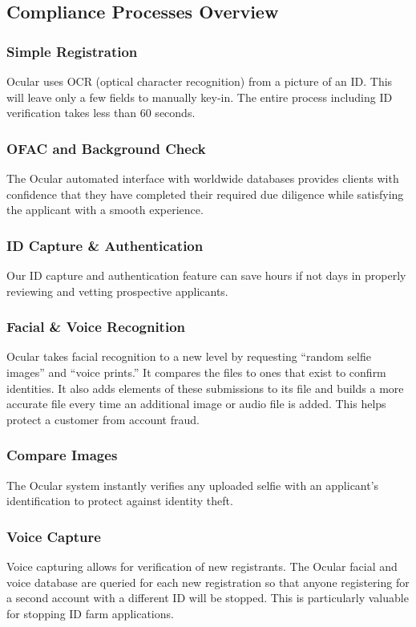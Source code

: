 \documentclass[a4paper]{article}
\begin{document}
\subsection{Compliance Processes Overview}
\subsubsection*{Simple Registration}
Ocular uses OCR (optical character recognition) from a picture of an ID. This will leave only a few fields to manually key-in. The entire process including ID verification takes less than 60 seconds.

\subsubsection*{OFAC and Background Check}
The Ocular automated interface with worldwide databases provides clients with confidence that they have completed their required due diligence while satisfying the applicant with a smooth experience. 

\subsubsection*{ID Capture \& Authentication}
Our ID capture and authentication feature can save hours if not days in properly reviewing and vetting prospective applicants. 

\subsubsection*{Facial \& Voice Recognition}
Ocular takes facial recognition to a new level by requesting “random selfie images” and “voice prints.” It compares the files to ones that exist to confirm identities. It also adds elements of these submissions to its file and builds a more accurate file every time an additional image or audio file is added. This helps protect a customer from account fraud.

\subsubsection*{Compare Images}
The Ocular system instantly verifies any uploaded selfie with an applicant’s identification to protect against identity theft.

\subsubsection*{Voice Capture}
Voice capturing allows for verification of new registrants. The Ocular facial and voice database are queried for each new registration so that anyone registering for a second account with a different ID will be stopped. This is particularly valuable for stopping ID farm applications.
\end{document}
